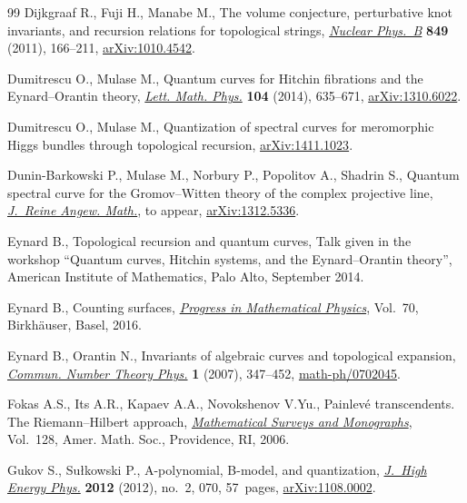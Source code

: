 \documentclass[pdftex]{sigma}
\theoremstyle{definition}
\numberwithin{equation}{section}
\begin{document}
\begin{thebibliography}{99}
Dijkgraaf R., Fuji H., Manabe M., The volume conjecture, perturbative knot
  invariants, and recursion relations for topological strings, \href{http://dx.doi.org/10.1016/j.nuclphysb.2011.03.014}{\textit{Nuclear
  Phys.~B}} \textbf{849} (2011), 166--211, \href{http://arxiv.org/abs/1010.4542}{arXiv:1010.4542}.

Dumitrescu O., Mulase M., Quantum curves for {H}itchin f\/ibrations and the
  {E}ynard--{O}rantin theory, \href{http://dx.doi.org/10.1007/s11005-014-0679-0}{\textit{Lett. Math. Phys.}} \textbf{104} (2014),
  635--671, \href{http://arxiv.org/abs/1310.6022}{arXiv:1310.6022}.

Dumitrescu O., Mulase M., Quantization of spectral curves for meromorphic
  {H}iggs bundles through topological recursion, \href{http://arxiv.org/abs/1411.1023}{arXiv:1411.1023}.

Dunin-Barkowski P., Mulase M., Norbury P., Popolitov A., Shadrin S., Quantum
  spectral curve for the {G}romov--{W}itten theory of the complex projective
  line, \href{http://dx.doi.org/10.1515/crelle-2014-0097}{\textit{J.~Reine Angew. Math.}}, {t}o appear, \href{http://arxiv.org/abs/1312.5336}{arXiv:1312.5336}.

Eynard B., Topological recursion and quantum curves, {T}alk given in the
  workshop ``Quantum curves, Hitchin systems, and the Eynard--Orantin theory'',
  American Institute of Mathematics, Palo Alto, September 2014.

Eynard B., Counting surfaces,
\href{http://dx.doi.org/10.1007/978-3-7643-8797-6}{\textit{Progress in Mathematical Physics}},
Vol.~70, Birkh\"auser, Basel, 2016.

Eynard B., Orantin N., Invariants of algebraic curves and topological
  expansion, \href{http://dx.doi.org/10.4310/CNTP.2007.v1.n2.a4}{\textit{Commun. Number Theory Phys.}} \textbf{1} (2007), 347--452,
  \href{http://arxiv.org/abs/math-ph/0702045}{math-ph/0702045}.

Fokas A.S., Its A.R., Kapaev A.A., Novokshenov V.Yu., Painlev\'e transcendents.
  The {R}iemann--{H}ilbert approach, \href{http://dx.doi.org/10.1090/surv/128}{\textit{Mathematical Surveys and
  Monographs}}, Vol.~128, Amer. Math. Soc., Providence, RI, 2006.

Gukov S., Su{\l}kowski P., A-polynomial, {B}-model, and quantization,
  \href{http://dx.doi.org/10.1007/JHEP02(2012)070}{\textit{J.~High Energy Phys.}} \textbf{2012} (2012), no.~2, 070, 57~pages,
  \href{http://arxiv.org/abs/1108.0002}{arXiv:1108.0002}.


\end{thebibliography}
\end{document}
